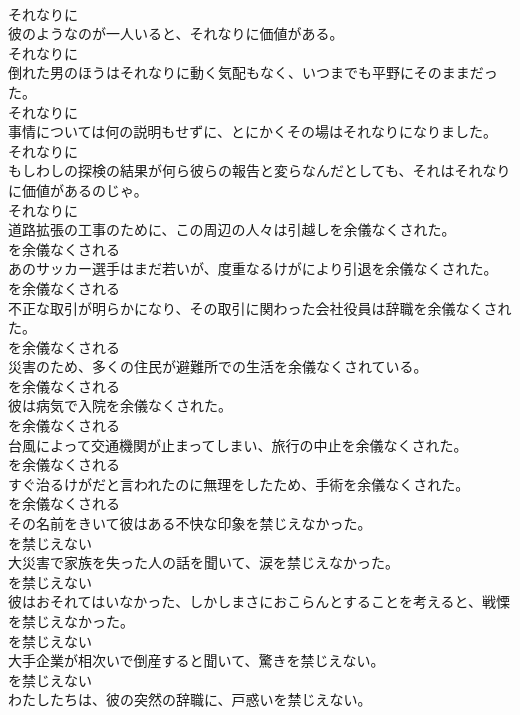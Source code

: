 \documentclass[8pt]{extreport}
\begin{document}
\begin{CJK}{UTF8}{min}
\\	それなりに	
\\	彼のようなのが一人いると、それなりに価値がある。	
\\	それなりに	
\\	倒れた男のほうはそれなりに動く気配もなく、いつまでも平野にそのままだった。	
\\	それなりに	
\\	事情については何の説明もせずに、とにかくその場はそれなりになりました。	
\\	それなりに	
\\	もしわしの探検の結果が何ら彼らの報告と変らなんだとしても、それはそれなりに価値があるのじゃ。	
\\	それなりに	
\\	道路拡張の工事のために、この周辺の人々は引越しを余儀なくされた。	
\\	を余儀なくされる	
\\	あのサッカー選手はまだ若いが、度重なるけがにより引退を余儀なくされた。	
\\	を余儀なくされる	
\\	不正な取引が明らかになり、その取引に関わった会社役員は辞職を余儀なくされた。	
\\	を余儀なくされる	
\\	災害のため、多くの住民が避難所での生活を余儀なくされている。	
\\	を余儀なくされる	
\\	彼は病気で入院を余儀なくされた。	
\\	を余儀なくされる	
\\	台風によって交通機関が止まってしまい、旅行の中止を余儀なくされた。	
\\	を余儀なくされる	
\\	すぐ治るけがだと言われたのに無理をしたため、手術を余儀なくされた。	
\\	を余儀なくされる	
\\	その名前をきいて彼はある不快な印象を禁じえなかった。	
\\	を禁じえない	
\\	大災害で家族を失った人の話を聞いて、涙を禁じえなかった。	
\\	を禁じえない	
\\	彼はおそれてはいなかった、しかしまさにおこらんとすることを考えると、戦慄を禁じえなかった。	
\\	を禁じえない	
\\	大手企業が相次いで倒産すると聞いて、驚きを禁じえない。	
\\	を禁じえない	
\\	わたしたちは、彼の突然の辞職に、戸惑いを禁じえない。	

\end{CJK}
\end{document}

